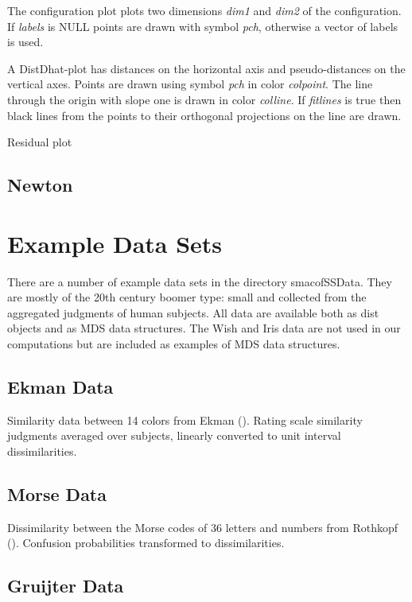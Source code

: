 \documentclass[
  12pt,
  letterpaper,
  DIV=11,
  numbers=noendperiod]{scrartcl}
\begin{document}
The configuration plot plots two dimensions \emph{dim1} and \emph{dim2}
of the configuration. If \emph{labels} is NULL points are drawn with
symbol \emph{pch}, otherwise a vector of labels is used.

A DistDhat-plot has distances on the horizontal axis and
pseudo-distances on the vertical axes. Points are drawn using symbol
\emph{pch} in color \emph{colpoint}. The line through the origin with
slope one is drawn in color \emph{colline}. If \emph{fitlines} is true
then black lines from the points to their orthogonal projections on the
line are drawn.

Residual plot

\subsection{Newton}\label{newton}

\section{Example Data Sets}\label{example-data-sets}

There are a number of example data sets in the directory smacofSSData.
They are mostly of the 20th century boomer type: small and collected
from the aggregated judgments of human subjects. All data are available
both as dist objects and as MDS data structures. The Wish and Iris data
are not used in our computations but are included as examples of MDS
data structures.

\subsection{Ekman Data}\label{ekman-data}

Similarity data between 14 colors from Ekman
(). Rating scale similarity judgments
averaged over subjects, linearly converted to unit interval
dissimilarities.

\subsection{Morse Data}\label{morse-data}

Dissimilarity between the Morse codes of 36 letters and numbers from
Rothkopf (). Confusion probabilities
transformed to dissimilarities.

\subsection{Gruijter Data}\label{gruijter-data}
\end{document}
